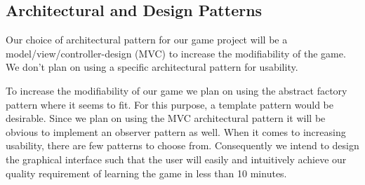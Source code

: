 \subsection{Architectural and Design Patterns}

Our choice of architectural pattern for our game project will be a model/view/controller-design (MVC) to increase the modifiability of the game. We don't plan on using a specific architectural pattern for usability.

To increase the modifiability of our game we plan on using the abstract factory pattern where it seems to fit. For this purpose, a template pattern would be desirable. Since we plan on using the MVC architectural pattern it will be obvious to implement an observer pattern as well. When it comes to increasing usability, there are few patterns to choose from. Consequently we intend to design the graphical interface such that the user will easily and intuitively achieve our quality requirement of learning the game in less than 10 minutes. 